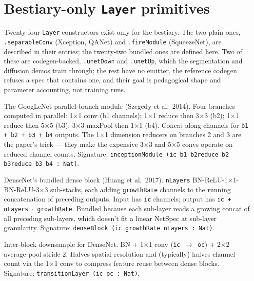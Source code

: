 \section{Bestiary-only \texttt{Layer} primitives}
\label{sec:bestiary_primitives}

Twenty-four \texttt{Layer} constructors exist only for the bestiary. The two
plain ones, \texttt{.separableConv} (Xception, QANet) and
\texttt{.fireModule} (SqueezeNet), are described in their entries; the
twenty-two bundled ones are defined here. Two of these are codegen-backed,
\texttt{.unetDown} and \texttt{.unetUp}, which the segmentation and diffusion
demos train through; the rest have no emitter, the reference codegen refuses a spec
that contains one, and their goal
is pedagogical shape and parameter accounting, not training runs.

\begin{definition}
  \label{layer:inceptionModule}
  \leanok
  The GoogLeNet parallel-branch module (Szegedy et al.\ 2014). Four
  branches computed in parallel: 1$\times$1 conv (b1 channels); 1$\times$1
  reduce then 3$\times$3 (b2); 1$\times$1 reduce then 5$\times$5 (b3);
  3$\times$3 maxPool then 1$\times$1 (b4). Concat along channels for
  \texttt{b1 + b2 + b3 + b4} outputs. The 1$\times$1 dimension reducers on
  branches 2 and 3 are the paper's trick --- they make the expensive
  3$\times$3 and 5$\times$5 convs operate on reduced channel counts.
  Signature: \texttt{inceptionModule (ic b1 b2reduce b2 b3reduce b3 b4 : Nat)}.
\end{definition}

\begin{definition}
  \label{layer:denseBlock}
  \leanok
  DenseNet's bundled dense block (Huang et al.\ 2017). \texttt{nLayers}
  BN-ReLU-1$\times$1-BN-ReLU-3$\times$3 sub-stacks, each adding
  \texttt{growthRate} channels to the running concatenation of
  preceding outputs. Input has \texttt{ic} channels; output has
  \texttt{ic + nLayers $\cdot$ growthRate}. Bundled because each
  sub-layer reads a growing concat of all preceding sub-layers,
  which doesn't fit a linear NetSpec at sub-layer granularity.
  Signature: \texttt{denseBlock (ic growthRate nLayers : Nat)}.
\end{definition}

\begin{definition}
  \label{layer:transitionLayer}
  \leanok
  Inter-block downsample for DenseNet. BN + 1$\times$1 conv
  (\texttt{ic $\to$ oc}) + 2$\times$2 average-pool stride 2.
  Halves spatial resolution and (typically) halves channel count
  via the 1$\times$1 conv to compress feature reuse between dense
  blocks. Signature: \texttt{transitionLayer (ic oc : Nat)}.
\end{definition}

